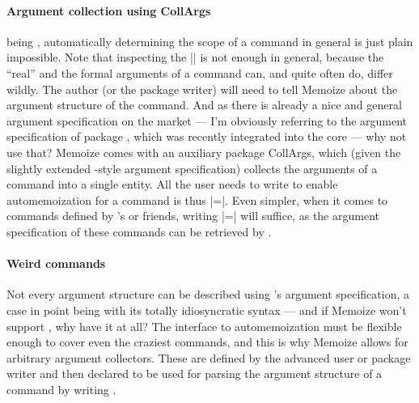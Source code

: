 \documentclass[a4paper,11pt]{article}
\begin{document}
\paragraph{Argument collection using CollArgs}
 being , automatically determining the scope of a
command in general is just plain impossible.  Note that inspecting the
|\meaning| is not enough in general, because the ``real'' and the formal
arguments of a command can, and quite often do, differ wildly.  The author (or the
package writer) will need to tell Memoize about the argument structure of the
command.  And as there is already a nice and general argument specification on
the market --- I'm obviously referring to the argument specification of package
, which was recently integrated into the core 
--- why not use that?  Memoize comes with an auxiliary package CollArgs, which
(given the slightly extended -style argument specification)
collects the arguments of a command into a single entity.  All the user needs
to write to enable automemoization for a command is thus
|=|.  Even simpler,
when it comes to commands defined by 's 
or friends, writing |=|
will suffice, as the argument specification of these commands can be retrieved
by .

\paragraph{Weird commands}
Not every argument structure can be described using 's argument
specification, a case in point being  with its totally
idiosyncratic syntax --- and if Memoize won't support , why have it at
all?  The interface to automemoization must be flexible enough to cover even
the craziest commands, and this is why Memoize allows for arbitrary argument
collectors.  These are defined by the advanced user or package writer and then
declared to be used for parsing the argument structure of a command by writing
.
\end{document}
